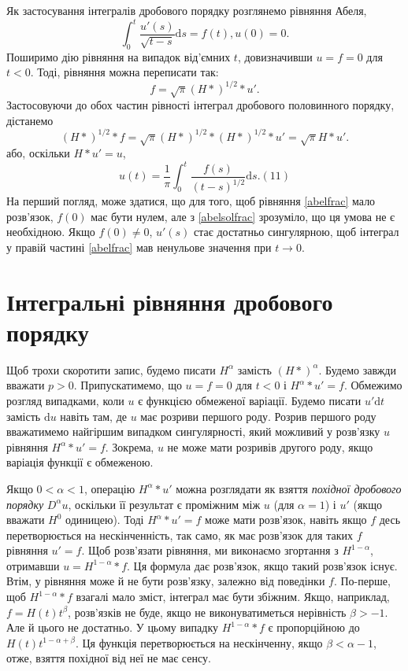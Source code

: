 \documentclass[14pt,twoside]{extreport}
\theoremstyle{mystyle}
\numberwithin{equation}{chapter}
\begin{document}
Як застосування інтегралів дробового порядку розглянемо рівняння Абеля,
\begin{equation}\label{abelfrac}
\displaystyle \int_{0}^{t}\frac{u'(s)}{\sqrt{t-s}}\mathrm{d}s=f(t) , u(0)=0.
\end{equation}
Поширимо дію рівняння на випадок від'ємних $t$, довизначивши $u=f=0$ для $t<0$. Тоді, рівняння можна переписати так:
\begin{equation}
f=\sqrt{\pi}(H*)^{1/2}*u'.
\end{equation}
Застосовуючи до обох частин рівності інтеграл дробового половинного порядку, дістанемо
\begin{equation}
(H*)^{1/2}*f=\sqrt{\pi}(H*)^{1/2}*(H*)^{1/2}*u'=\sqrt{\pi}H*u'.
\end{equation}
або, оскільки $H*u'=u$,
\begin{equation}\label{abelsolfrac}
u(t)=\dfrac{1}{\pi}\int_{0}^{t}\dfrac{f(s)}{(t-s)^{1/2}}\mathrm{d}s. (11)
\end{equation}
На перший погляд, може здатися, що для того, щоб рівняння \eqref{abelfrac} мало розв'язок, $f(0)$ має бути нулем, але з \eqref{abelsolfrac} зрозуміло, що ця умова не є необхідною. Якщо $f(0)\neq 0$, $u'(s)$ стає достатньо сингулярною, щоб інтеграл у правій частині \eqref{abelfrac} мав ненульове значення при $t\to 0$.

\section{Інтегральні рівняння дробового порядку}

Щоб трохи скоротити запис, будемо писати $H^{\alpha}$ замість $(H*)^{\alpha}$. Будемо завжди вважати $p>0$. Припускатимемо, що $u=f=0$ для $t<0$ і $H^{\alpha}*u'=f$. Обмежимо розгляд випадками, коли $u$ є функцією обмеженої варіації. Будемо писати $u'\mathrm{d}t$ замість $\mathrm{d}u$ навіть там, де $u$ має розриви першого роду. Розрив першого роду вважатимемо найгіршим випадком сингулярності, який можливий у розв'язку $u$ рівняння $H^{\alpha}*u'=f$. Зокрема, $u$ не може мати розривів другого роду, якщо варіація функції є обмеженою.

Якщо $0<\alpha<1$, операцію $H^{\alpha}*u'$ можна розглядати як взяття \emph{похідної дробового порядку} $D^{\alpha}u$, оскільки її результат є проміжним між $u$ (для $\alpha=1$) і $u'$ (якщо вважати $H^{0}$ одиницею). Тоді $H^{\alpha}*u'=f$ може мати розв'язок, навіть якщо $f$ десь перетворюється на нескінченність, так само, як має розв'язок для таких $f$ рівняння $u'=f$. Щоб розв'язати рівняння, ми виконаємо згортання з $H^{1-\alpha}$, отримавши $u=H^{1-\alpha}*f$. Ця формула дає розв'язок, якщо такий розв'язок існує. Втім, у рівняння може й не бути розв'язку, залежно від поведінки $f$. По-перше, щоб $H^{1-\alpha}*f$ взагалі мало зміст, інтеграл має бути збіжним. Якщо, наприклад, $f=H(t)t^{\beta}$, розв'язків не буде, якщо не виконуватиметься нерівність $\beta>-1$. Але й цього не достатньо. У цьому випадку $H^{1-\alpha}*f$ є пропорційною до  $H(t)t^{1-\alpha+\beta}$. Ця функція перетворюється на нескінченну, якщо $\beta<\alpha-1$, отже, взяття похідної від неї не має сенсу.
\end{document}
